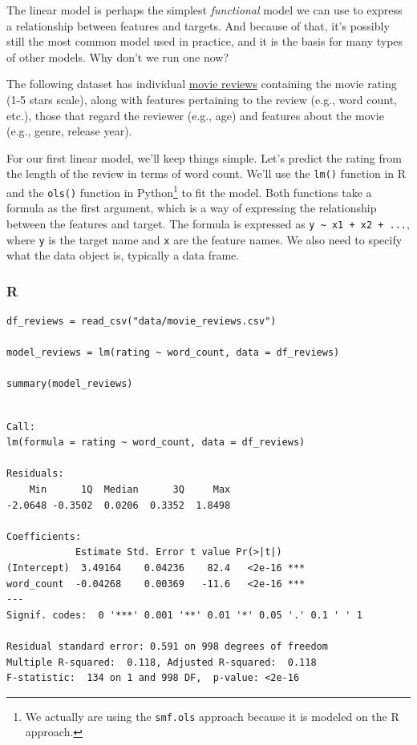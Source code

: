 \documentclass[
  letterpaper,
]{krantz}
\begin{document}
The linear model is perhaps the simplest \emph{functional} model we can
use to express a relationship between features and targets. And because
of that, it's possibly still the most common model used in practice, and
it is the basis for many types of other models. Why don't we run one
now?

The following dataset has individual \hyperref[app-data-review]{movie
reviews} containing the movie rating (1-5 stars scale), along with
features pertaining to the review (e.g., word count, etc.), those that
regard the reviewer (e.g., age) and features about the movie (e.g.,
genre, release year).

For our first linear model, we'll keep things simple. Let's predict the
rating from the length of the review in terms of word count. We'll use
the \texttt{lm()} function in R and the \texttt{ols()} function in
Python\footnote{We actually are using the \texttt{smf.ols} approach
  because it is modeled on the R approach.} to fit the model. Both
functions take a formula as the first argument, which is a way of
expressing the relationship between the features and target. The formula
is expressed as \texttt{y\ \textasciitilde{}\ x1\ +\ x2\ +\ ...}, where
\texttt{y} is the target name and \texttt{x} are the feature names. We
also need to specify what the data object is, typically a data frame.

\subsubsection{R}

\begin{verbatim}
df_reviews = read_csv("data/movie_reviews.csv")

model_reviews = lm(rating ~ word_count, data = df_reviews)

summary(model_reviews)
\end{verbatim}

\begin{verbatim}

Call:
lm(formula = rating ~ word_count, data = df_reviews)

Residuals:
    Min      1Q  Median      3Q     Max 
-2.0648 -0.3502  0.0206  0.3352  1.8498 

Coefficients:
            Estimate Std. Error t value Pr(>|t|)    
(Intercept)  3.49164    0.04236    82.4   <2e-16 ***
word_count  -0.04268    0.00369   -11.6   <2e-16 ***
---
Signif. codes:  0 '***' 0.001 '**' 0.01 '*' 0.05 '.' 0.1 ' ' 1

Residual standard error: 0.591 on 998 degrees of freedom
Multiple R-squared:  0.118, Adjusted R-squared:  0.118 
F-statistic:  134 on 1 and 998 DF,  p-value: <2e-16
\end{verbatim}
\end{document}
